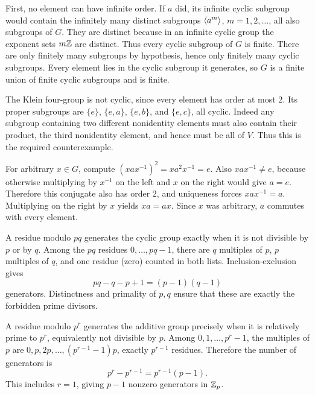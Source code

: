 
First, no element can have infinite order. If $a$ did, its infinite cyclic subgroup would contain the infinitely many distinct subgroups $\langle a^m\rangle$, $m=1,2,\ldots$, all also subgroups of $G$. They are distinct because in an infinite cyclic group the exponent sets $m\mathbb{Z}$ are distinct. Thus every cyclic subgroup of $G$ is finite. There are only finitely many subgroups by hypothesis, hence only finitely many cyclic subgroups. Every element lies in the cyclic subgroup it generates, so $G$ is a finite union of finite cyclic subgroups and is finite.


The Klein four-group is not cyclic, since every element has order at most $2$. Its proper subgroups are $\{e\}$, $\{e,a\}$, $\{e,b\}$, and $\{e,c\}$, all cyclic. Indeed any subgroup containing two different nonidentity elements must also contain their product, the third nonidentity element, and hence must be all of $V$. Thus this is the required counterexample.


For arbitrary $x\in G$, compute $(xax^{-1})^2=xa^2x^{-1}=e$. Also $xax^{-1}\ne e$, because otherwise multiplying by $x^{-1}$ on the left and $x$ on the right would give $a=e$. Therefore this conjugate also has order $2$, and uniqueness forces $xax^{-1}=a$. Multiplying on the right by $x$ yields $xa=ax$. Since $x$ was arbitrary, $a$ commutes with every element.


A residue modulo $pq$ generates the cyclic group exactly when it is not divisible by $p$ or by $q$. Among the $pq$ residues $0,\ldots,pq-1$, there are $q$ multiples of $p$, $p$ multiples of $q$, and one residue (zero) counted in both lists. Inclusion-exclusion gives
\[pq-q-p+1=(p-1)(q-1)
\]
generators. Distinctness and primality of $p,q$ ensure that these are exactly the forbidden prime divisors.

A residue modulo $p^r$ generates the additive group precisely when it is relatively prime to $p^r$, equivalently not divisible by $p$. Among $0,1,\ldots,p^r-1$, the multiples of $p$ are $0,p,2p,\ldots,(p^{r-1}-1)p$, exactly $p^{r-1}$ residues. Therefore the number of generators is
\[p^r-p^{r-1}=p^{r-1}(p-1).\]
This includes $r=1$, giving $p-1$ nonzero generators in $\mathbb{Z}_p$.

